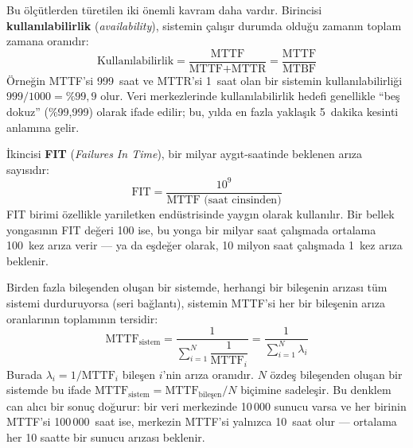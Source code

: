 Bu ölçütlerden türetilen iki önemli kavram daha vardır. Birincisi \textbf{kullanılabilirlik} (\emph{availability}), sistemin çalışır durumda olduğu zamanın toplam zamana oranıdır:
%
\begin{equation}
\text{Kullanılabilirlik} = \frac{\text{MTTF}}{\text{MTTF} + \text{MTTR}} = \frac{\text{MTTF}}{\text{MTBF}}
\label{eq:kullanilabilirlik}
\end{equation}
%
Örneğin MTTF'si 999~saat ve MTTR'si 1~saat olan bir sistemin kullanılabilirliği $999/1000 = \%99{,}9$ olur. Veri merkezlerinde kullanılabilirlik hedefi genellikle ``beş dokuz'' (\%99,999) olarak ifade edilir; bu, yılda en fazla yaklaşık 5~dakika kesinti anlamına gelir.

İkincisi \textbf{FIT} (\emph{Failures In Time}), bir milyar aygıt-saatinde beklenen arıza sayısıdır:
%
\begin{equation}
\text{FIT} = \frac{10^9}{\text{MTTF (saat cinsinden)}}
\label{eq:fit}
\end{equation}
%
FIT birimi özellikle yarıiletken endüstrisinde yaygın olarak kullanılır. Bir bellek yongasının FIT değeri 100 ise, bu yonga bir milyar saat çalışmada ortalama 100~kez arıza verir --- ya da eşdeğer olarak, 10 milyon saat çalışmada 1~kez arıza beklenir.

Birden fazla bileşenden oluşan bir sistemde, herhangi bir bileşenin arızası tüm sistemi durduruyorsa (seri bağlantı), sistemin MTTF'si her bir bileşenin arıza oranlarının toplamının tersidir:
%
\begin{equation}
\text{MTTF}_{\text{sistem}} = \frac{1}{\displaystyle\sum_{i=1}^{N} \dfrac{1}{\text{MTTF}_i}} = \frac{1}{\displaystyle\sum_{i=1}^{N} \lambda_i}
\label{eq:mttf-sistem}
\end{equation}
%
Burada $\lambda_i = 1/\text{MTTF}_i$ bileşen $i$'nin arıza oranıdır. $N$ özdeş bileşenden oluşan bir sistemde bu ifade $\text{MTTF}_{\text{sistem}} = \text{MTTF}_{\text{bileşen}} / N$ biçimine sadeleşir. Bu denklem can alıcı bir sonuç doğurur: bir veri merkezinde 10\,000 sunucu varsa ve her birinin MTTF'si 100\,000~saat ise, merkezin MTTF'si yalnızca 10~saat olur --- ortalama her 10 saatte bir sunucu arızası beklenir.

